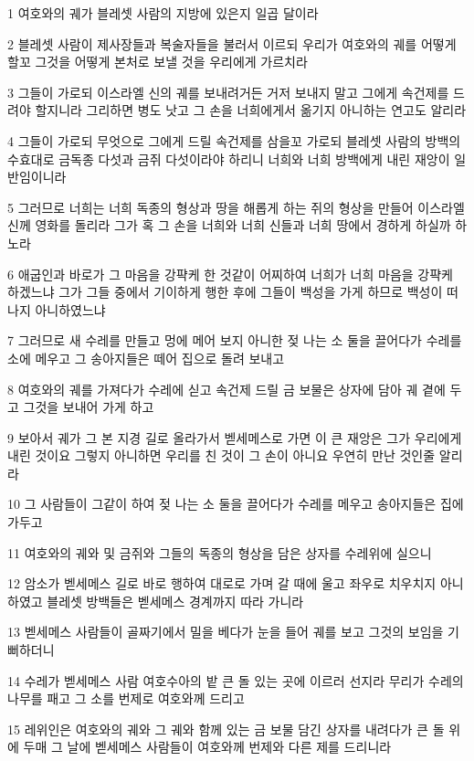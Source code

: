 \par 1 여호와의 궤가 블레셋 사람의 지방에 있은지 일곱 달이라
\par 2 블레셋 사람이 제사장들과 복술자들을 불러서 이르되 우리가 여호와의 궤를 어떻게 할꼬 그것을 어떻게 본처로 보낼 것을 우리에게 가르치라
\par 3 그들이 가로되 이스라엘 신의 궤를 보내려거든 거저 보내지 말고 그에게 속건제를 드려야 할지니라 그리하면 병도 낫고 그 손을 너희에게서 옮기지 아니하는 연고도 알리라
\par 4 그들이 가로되 무엇으로 그에게 드릴 속건제를 삼을꼬 가로되 블레셋 사람의 방백의 수효대로 금독종 다섯과 금쥐 다섯이라야 하리니 너희와 너희 방백에게 내린 재앙이 일반임이니라
\par 5 그러므로 너희는 너희 독종의 형상과 땅을 해롭게 하는 쥐의 형상을 만들어 이스라엘 신께 영화를 돌리라 그가 혹 그 손을 너희와 너희 신들과 너희 땅에서 경하게 하실까 하노라
\par 6 애굽인과 바로가 그 마음을 강퍅케 한 것같이 어찌하여 너희가 너희 마음을 강퍅케 하겠느냐 그가 그들 중에서 기이하게 행한 후에 그들이 백성을 가게 하므로 백성이 떠나지 아니하였느냐
\par 7 그러므로 새 수레를 만들고 멍에 메어 보지 아니한 젖 나는 소 둘을 끌어다가 수레를 소에 메우고 그 송아지들은 떼어 집으로 돌려 보내고
\par 8 여호와의 궤를 가져다가 수레에 싣고 속건제 드릴 금 보물은 상자에 담아 궤 곁에 두고 그것을 보내어 가게 하고
\par 9 보아서 궤가 그 본 지경 길로 올라가서 벧세메스로 가면 이 큰 재앙은 그가 우리에게 내린 것이요 그렇지 아니하면 우리를 친 것이 그 손이 아니요 우연히 만난 것인줄 알리라
\par 10 그 사람들이 그같이 하여 젖 나는 소 둘을 끌어다가 수레를 메우고 송아지들은 집에 가두고
\par 11 여호와의 궤와 및 금쥐와 그들의 독종의 형상을 담은 상자를 수레위에 실으니
\par 12 암소가 벧세메스 길로 바로 행하여 대로로 가며 갈 때에 울고 좌우로 치우치지 아니하였고 블레셋 방백들은 벧세메스 경계까지 따라 가니라
\par 13 벧세메스 사람들이 골짜기에서 밀을 베다가 눈을 들어 궤를 보고 그것의 보임을 기뻐하더니
\par 14 수레가 벧세메스 사람 여호수아의 밭 큰 돌 있는 곳에 이르러 선지라 무리가 수레의 나무를 패고 그 소를 번제로 여호와께 드리고
\par 15 레위인은 여호와의 궤와 그 궤와 함께 있는 금 보물 담긴 상자를 내려다가 큰 돌 위에 두매 그 날에 벧세메스 사람들이 여호와께 번제와 다른 제를 드리니라
